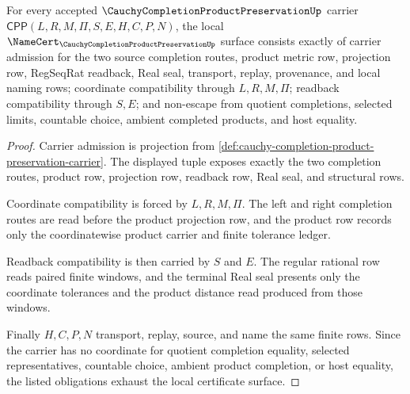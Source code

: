 \begin{theorem}
\label{thm:cauchy-completion-product-preservation-namecert-obligations}
For every accepted $\CauchyCompletionProductPreservationUp$ carrier $\mathsf{CPP}(L,R,M,\Pi,S,E,H,C,P,N)$, the local $\NameCert_{\CauchyCompletionProductPreservationUp}$ surface consists exactly of carrier admission for the two source completion routes, product metric row, projection row, RegSeqRat readback, Real seal, transport, replay, provenance, and local naming rows; coordinate compatibility through $L,R,M,\Pi$; readback compatibility through $S,E$; and non-escape from quotient completions, selected limits, countable choice, ambient completed products, and host equality.
\end{theorem}
\begin{proof}
Carrier admission is projection from \autoref{def:cauchy-completion-product-preservation-carrier}. The displayed tuple exposes exactly the two completion routes, product row, projection row, readback row, Real seal, and structural rows.

Coordinate compatibility is forced by $L,R,M,\Pi$. The left and right completion routes are read before the product projection row, and the product row records only the coordinatewise product carrier and finite tolerance ledger.

Readback compatibility is then carried by $S$ and $E$. The regular rational row reads paired finite windows, and the terminal Real seal presents only the coordinate tolerances and the product distance read produced from those windows.

Finally $H,C,P,N$ transport, replay, source, and name the same finite rows. Since the carrier has no coordinate for quotient completion equality, selected representatives, countable choice, ambient product completion, or host equality, the listed obligations exhaust the local certificate surface.
\end{proof}

